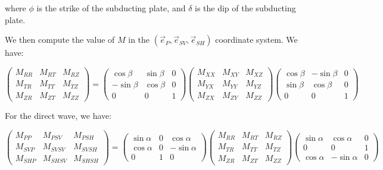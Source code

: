 \documentclass[main.tex]{subfiles}
\begin{document}
where $\phi$ is the strike of the subducting plate, and $\delta$ is the dip of the subducting plate.

We then compute the value of $M$ in the $(\vec{e}_P, \vec{e}_{SV}, \vec{e}_{SH})$ coordinate system. We have:

\begin{equation}
\begin{pmatrix}
M_{RR} & M_{RT} & M_{RZ} \\
M_{TR} & M_{TT} & M_{TZ} \\
M_{ZR} & M_{ZT} & M_{ZZ}
\end{pmatrix} = \begin{pmatrix}
\cos \beta & \sin \beta & 0 \\
- \sin \beta & \cos \beta & 0 \\
0 & 0 & 1
\end{pmatrix} \begin{pmatrix}
M_{XX} & M_{XY} & M_{XZ} \\
M_{YX} & M_{YY} & M_{YZ} \\
M_{ZX} & M_{ZY} & M_{ZZ}
\end{pmatrix} \begin{pmatrix}
\cos \beta & - \sin \beta & 0 \\
\sin \beta & \cos \beta & 0 \\
0 & 0 & 1
\end{pmatrix}
\end{equation}

For the direct wave, we have:

\begin{equation}
\begin{pmatrix}
M_{PP} & M_{PSV} & M_{PSH} \\
M_{SVP} & M_{SVSV} & M_{SVSH} \\
M_{SHP} & M_{SHSV} & M_{SHSH}
\end{pmatrix} = \begin{pmatrix}
\sin \alpha & 0 & \cos \alpha \\
\cos \alpha & 0 & - \sin \alpha \\
0 & 1 & 0
\end{pmatrix} \begin{pmatrix}
M_{RR} & M_{RT} & M_{RZ} \\
M_{TR} & M_{TT} & M_{TZ} \\
M_{ZR} & M_{ZT} & M_{ZZ}
\end{pmatrix} \begin{pmatrix}
\sin \alpha & \cos \alpha & 0 \\
0 & 0 & 1 \\
\cos \alpha & - \sin \alpha & 0
\end{pmatrix}
\end{equation}
\end{document}
